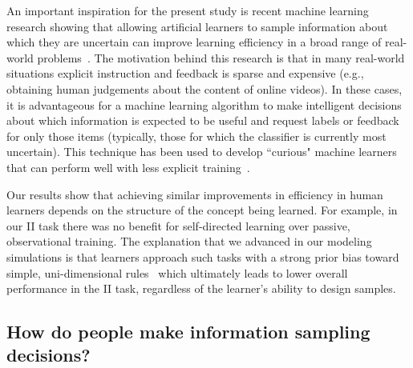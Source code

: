 \documentclass[3p,twocolumn,authoryear,10pt]{elsarticle}
\begin{document}
An important inspiration for the present study is recent machine learning research showing that allowing artificial learners to sample information about which they are uncertain can improve learning efficiency in a broad range of real-world problems~\citep{Castro:2008p12850,Cohn:1992tw,Dasgupta:2005xv,Mackay:1992kn,Settles:2009p13423}.  The motivation behind this research is that in many real-world situations explicit instruction and feedback is sparse and expensive (e.g., obtaining human judgements about the content of online videos).   In these cases, it is advantageous for a machine learning algorithm to make intelligent decisions about which information is expected to be useful and request labels or feedback for only those items (typically, those for which the classifier is currently most uncertain).   This technique has been used to develop ``curious" machine learners that can perform well with less explicit training~\citep[c.f.][]{schmidhuber1991curious,Murphy:2001rp,Tong:2001if,Cohn:1992tw}.

Our results show that achieving similar improvements in efficiency in human learners depends on the structure of the concept being learned. For example, in our II task there was no benefit for self-directed learning over passive, observational training.  The explanation that we advanced in our modeling simulations is that learners approach such tasks with a strong prior bias toward simple, uni-dimensional rules~\citep{Ashby:1999ig,Ashby:2002p13331,Gureckis:2002ys} which ultimately leads to lower overall performance in the II task, regardless of the learner's ability to design samples.   

\subsection{How do people make information sampling decisions?}
\end{document}
